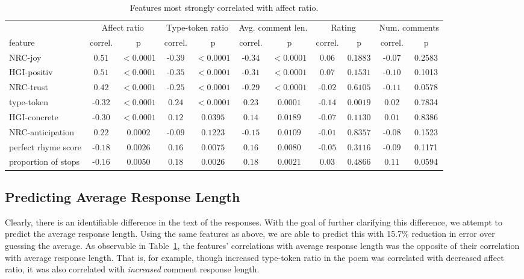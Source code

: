 \documentclass[11pt]{article}
\begin{document}
\begin{table}['ht]
\tiny
\begin{center}
\caption{Features most strongly correlated with affect ratio.}
\label{feature-correlation}
\vskip 0.12in
\begin{tabular}{l|cc|cc|cc|cc|cc}
\hline
&\multicolumn{2}{|c|}{Affect ratio}&\multicolumn{2}{|c|}{Type-token ratio}&\multicolumn{2}{|c|}{Avg. comment len.}&\multicolumn{2}{|c|}{Rating}&\multicolumn{2}{|c}{Num. comments}
\\ feature & correl. & p & correl. & p & correl. & p & correl. & p & correl. & p
\\\hline
NRC-joy & $0.51$ & $<0.0001$ & -$0.39$ & $<0.0001$ & -$0.34$ & $<0.0001$ & $0.06$ & $0.1883$ & -$0.07$ & 0.2583
\\ HGI-positiv & $0.51$ & $<0.0001$ & -$0.35$ & $<0.0001$ & -$0.31$ & $<0.0001$ & $0.07$ & $0.1531$ & -$0.10$ & 0.1013
\\ NRC-trust & $0.42$ & $<0.0001$ & -$0.25$ & $<0.0001$ & -$0.29$ & $<0.0001$ & -$0.02$ & $0.6105$ & -$0.11$ & 0.0578
\\ type-token & -$0.32$ & $<0.0001$ & $0.24$ & $<0.0001$ & $0.23$ & $0.0001$ & -$0.14$ & $0.0019$ & $0.02$ & 0.7834
\\ HGI-concrete & -$0.30$ & $<0.0001$ & $0.12$ & $0.0395$ & $0.14$ & $0.0189$ & -$0.07$ & $0.1130$ & $0.01$ & 0.8386
\\ NRC-anticipation & $0.22$ & $0.0002$ & -$0.09$ & $0.1223$ & -$0.15$ & $0.0109$ & -$0.01$ & $0.8357$ & -$0.08$ & 0.1523
\\ perfect rhyme score & -$0.18$ & $0.0026$ & $0.16$ & $0.0075$ & $0.16$ & $0.0080$ & -$0.05$ & $0.3116$ & -$0.09$ & 0.1171
\\ proportion of stops & -$0.16$ & $0.0050$ & $0.18$ & $0.0026$ & $0.18$ & $0.0021$ & $0.03$ & $0.4866$ & $0.11$ & 0.0594
\\ \hline
\end{tabular}
\end{center}
\end{table}

\subsection{Predicting Average Response Length}
Clearly, there is an identifiable difference in the text of the responses. With the goal of further clarifying this difference, we attempt to predict the average response length. Using the same features as above, we are able to predict this with 15.7\% reduction in error over guessing the average. As observable in Table~\ref{feature-correlation}, the features’ correlations with average response length was the opposite of their correlation with average response length. That is, for example, though increased type-token ratio in the poem was correlated with decreased affect ratio, it was also correlated with \emph{increased} comment response length.
\end{document}

